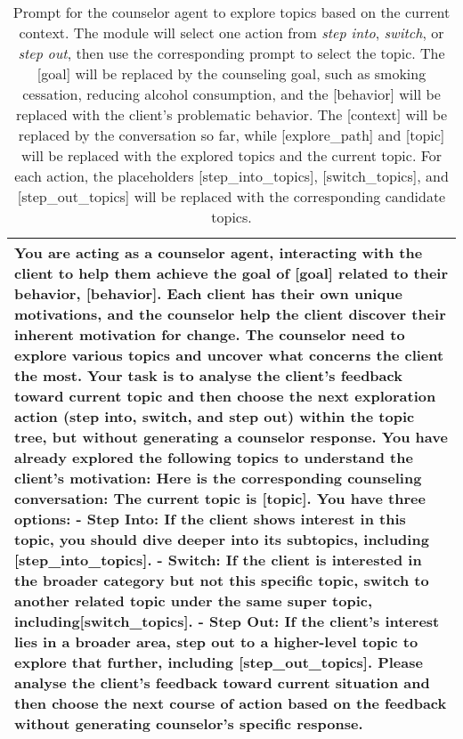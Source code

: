 \begin{table*}[tb]
\begin{tabularx}{\textwidth}{X}
\toprule
{\sf \footnotesize You are acting as a counselor agent, interacting with the client to help them achieve the goal of [goal] related to their behavior, [behavior]. Each client has their own unique motivations, and the counselor help the client discover their inherent motivation for change. The counselor need to explore various topics and uncover what concerns the client the most.  Your task is to analyse the client's feedback toward current topic and then choose the next exploration action (step into, switch, and step out) within the topic tree, but without generating a counselor response. \newline \newline You have already explored the following topics to understand the client’s motivation:  \newline Here is the corresponding counseling conversation: \newline [context] \newline The current topic is [topic]. \newline \newline You have three options: \newline - Step Into: If the client shows interest in this topic, you should dive deeper into its subtopics, including [step\_into\_topics]. \newline - Switch: If the client is interested in the broader category but not this specific topic, switch to another related topic under the same super topic, including[switch\_topics]. \newline - Step Out: If the client’s interest lies in a broader area, step out to a higher-level topic to explore that further, including [step\_out\_topics]. \newline \newline Please analyse the client's feedback toward current situation and then  choose the next course of action based on the feedback without generating counselor's specific response. }
\\ \bottomrule
\end{tabularx}
\caption{Prompt for the counselor agent to explore topics based on the current context. The module will select one action from {\em step into}, {\em switch}, or {\em step out}, then use the corresponding prompt to select the topic. The [goal] will be replaced by the counseling goal, such as smoking cessation, reducing alcohol consumption, and the [behavior] will be replaced with the client's problematic behavior. The [context] will be replaced by the conversation so far, while [explore\_path] and [topic] will be replaced with the explored topics and the current topic. For each action, the placeholders [step\_into\_topics], [switch\_topics], and [step\_out\_topics] will be replaced with the corresponding candidate topics.}
\label{tab:topic exploration}
\end{table*}

